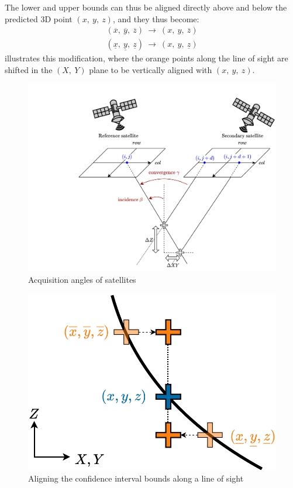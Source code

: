 The lower and upper bounds can thus be aligned directly above and below the predicted 3D point $(x, ~y, ~z)$, and they thus become:
\begin{align}
    (\overline{x}, ~\overline{y}, ~\overline{z}) ~\rightarrow~ (x, ~y, ~\overline{z})\\
    (\underline{x}, ~\underline{y}, ~\underline{z}) ~\rightarrow~ (x, ~y, ~\underline{z})
\end{align}
 illustrates this modification, where the orange points along the line of sight are shifted in the $(X,~Y)$ plane to be vertically aligned with $(x, ~y, ~z)$. 

\begin{figure}
    \centering
    \includegraphics[width=0.8\linewidth]{Images/Chap_6/Incidence_angle.png}
    \caption{Acquisition angles of satellites}
    \label{fig:incidence_angle}
\end{figure}

\begin{figure}
    \centering
    \includegraphics[width=0.6\linewidth]{Images/Chap_6/Planimetric_shift.png}
    \caption{Aligning the confidence interval bounds along a line of sight}
    \label{fig:planimetric_shift}
\end{figure}

